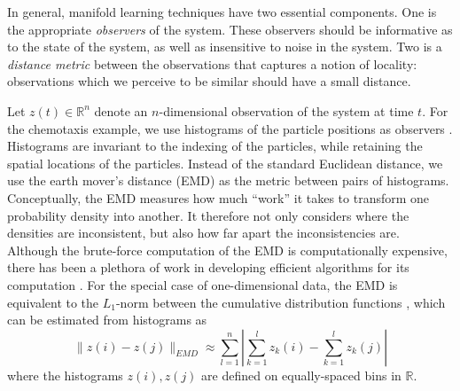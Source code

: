\documentclass[prl, reprint]{revtex4-1}
\begin{document}
In general, manifold learning techniques have two essential components.
%
One is the appropriate {\em observers} of the system. 
%
These observers should be informative as to the state of the system, as well as insensitive to noise in the system. 
%
Two is a {\em distance metric} between the observations that captures a notion of locality: observations which we perceive to be similar should have a small distance. 

Let $z(t) \in \mathbb{R}^n$ denote an $n$-dimensional observation of the system at time $t$. 
%
For the chemotaxis example, we use histograms of the particle positions as observers \cite{talmon2013empirical}. 
%
Histograms are invariant to the indexing of the particles, while retaining the spatial locations of the particles.
%
Instead of the standard Euclidean distance, we use the earth mover's distance (EMD) \cite{rubner2000earth} as the metric between pairs of histograms. 
%
Conceptually, the EMD measures how much ``work'' it takes to transform one probability density into another.
%
It therefore not only considers where the densities are inconsistent, but also how far apart the inconsistencies are.
%
Although the brute-force computation of the EMD is computationally expensive, there has been a plethora of work in developing efficient algorithms for its computation \cite{Pele-eccv2008, Pele-iccv2009}.
%
For the special case of one-dimensional data, the EMD is equivalent to the $L_1$-norm between the cumulative distribution functions \cite{rubner2000perceptual}, which can be estimated from histograms as
\begin{equation}
\| z(i) - z(j) \|_{EMD} \approx \sum_{l=1}^{n} \left| \sum_{k=1}^l z_k(i) - \sum_{k=1}^l z_k(j) \right|
\end{equation}
where the histograms $z(i), z(j)$ are defined on equally-spaced bins in $\mathbb{R}$. 
\end{document}
